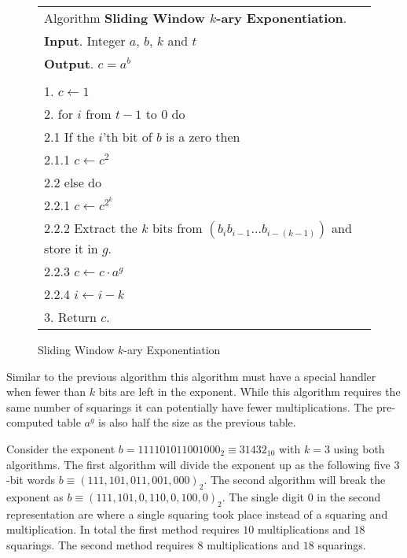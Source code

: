 \documentclass[b5paper]{book}
\begin{document}
\newpage\begin{figure}[!here]
\begin{small}
\begin{center}
\begin{tabular}{l}
\hline Algorithm \textbf{Sliding Window $k$-ary Exponentiation}. \\
\textbf{Input}.   Integer $a$, $b$, $k$ and $t$ \\
\textbf{Output}.  $c = a^b$ \\
\hline \\
1.  $c \leftarrow 1$ \\
2.  for $i$ from $t - 1$ to $0$ do \\
\hspace{3mm}2.1  If the $i$'th bit of $b$ is a zero then \\
\hspace{6mm}2.1.1   $c \leftarrow c^2$ \\
\hspace{3mm}2.2  else do \\
\hspace{6mm}2.2.1  $c \leftarrow c^{2^k}$ \\
\hspace{6mm}2.2.2  Extract the $k$ bits from $(b_{i}b_{i-1}\ldots b_{i-(k-1)})$ and store it in $g$. \\
\hspace{6mm}2.2.3  $c \leftarrow c \cdot a^g$ \\
\hspace{6mm}2.2.4  $i \leftarrow i - k$ \\
3.  Return $c$. \\
\hline
\end{tabular}
\end{center}
\end{small}
\caption{Sliding Window $k$-ary Exponentiation}
\end{figure}

Similar to the previous algorithm this algorithm must have a special handler when fewer than $k$ bits are left in the exponent.  While this
algorithm requires the same number of squarings it can potentially have fewer multiplications.  The pre-computed table $a^g$ is also half
the size as the previous table.  

Consider the exponent $b = 111101011001000_2 \equiv 31432_{10}$ with $k = 3$ using both algorithms.  The first algorithm will divide the exponent up as 
the following five $3$-bit words $b \equiv \left ( 111, 101, 011, 001, 000 \right )_{2}$.  The second algorithm will break the 
exponent as $b \equiv \left ( 111, 101, 0, 110, 0, 100, 0 \right )_{2}$.  The single digit $0$ in the second representation are where
a single squaring took place instead of a squaring and multiplication.  In total the first method requires $10$ multiplications and $18$ 
squarings.  The second method requires $8$ multiplications and $18$ squarings.  
\end{document}
